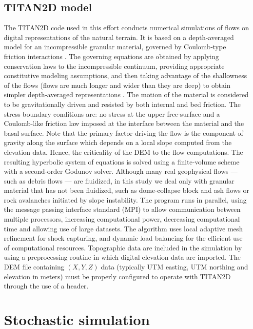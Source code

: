 \documentclass[a4paper,fleqn]{article}
\begin{document}
\subsection{TITAN2D model}

The TITAN2D code used in this effort conducts numerical simulations of
flows on digital representations of the natural terrain.  It is based
on a depth-averaged model for an incompressible granular material,
governed by Coulomb-type friction interactions \citep{Savage1989}.
The governing equations are obtained by applying conservation laws to
the incompressible continuum, providing appropriate constitutive
modeling assumptions, and then taking advantage of the shallowness of
the flows (flows are much longer and wider than they are deep) to
obtain simpler depth-averaged representations \citep{Patra2005}. The
motion of the material is considered to be gravitationally driven and
resisted by both internal and bed friction. The stress boundary
conditions are: no stress at the upper free-surface and a Coulomb-like
friction law imposed at the interface between the material and the
basal surface. Note that the primary factor driving the flow is the
component of gravity along the surface which depends on a local slope
computed from the elevation data.  Hence, the criticality of the DEM
to the flow computations. The resulting hyperbolic system of equations
is solved using a finite-volume scheme with a second-order Godunov
solver. Although many real geophysical flows --- such as debris flows
--- are fluidized, in this study we deal only with granular material
that has not been fluidized, such as dome-collapse block and ash flows
or rock avalanches initiated by slope instability.
The program runs in parallel, using the message passing interface
standard (MPI) to allow communication between multiple processors,
increasing computational power, decreasing computational time and
allowing use of large datasets. The algorithm uses local adaptive mesh
refinement for shock capturing, and dynamic load balancing for the
efficient use of computational resources. Topographic data are
included in the simulation by using a preprocessing routine in which
digital elevation data are imported. The DEM file containing $(X, Y,
Z)$ data (typically UTM easting, UTM northing and elevation in meters)
must be properly configured to operate with TITAN2D through the use of
a header.

\section{Stochastic simulation}
\end{document}
